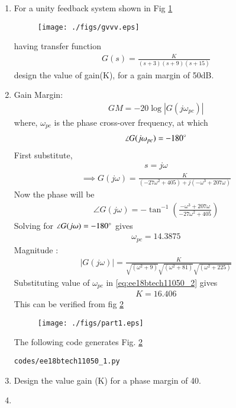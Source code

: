 
\begin{enumerate}[label=\thesection.\arabic*.,ref=\thesection.\theenumi]
\item For a unity feedback system shown in Fig \ref{fig:ee18btech11050_fig1}
\begin{figure}[!ht]
\centering
\texttt{[image: ./figs/gvvv.eps]}
\caption{}
\label{fig:ee18btech11050_fig1}
\end{figure}
having transfer function
\begin{align}
    G(s) = \frac{K}{(s+3)(s+9)(s+15)}
    \label{eq:ee18btech11050_1}
\end{align}
design the value of gain(K), for a gain margin of 50dB.

\item \solution

Gain Margin:
\begin{align}
    GM = -20\log{|G(j\omega_{pc})|}
    \label{eq:ee18btech11050_2}
\end{align}
where, $\omega_{pc}$ is the phase cross-over frequency, at which
\begin{align}
    \angle {G(j \omega_{pc})} = -180 \degree
    \label{eq:ee18btech11050_3}
\end{align}
First substitute, 
\begin{align}
    s = j\omega
\end{align}
\begin{align}
    \implies G(j\omega) = \frac{K}{(-27\omega^2+405)+j(-\omega^3+207\omega)}
    \label{eq:ee18btech11050_4}
\end{align}
Now the phase will be
\begin{align}
    \angle{G(j\omega)} = -\tan^{-1}(\frac{-\omega^3+207\omega}{-27\omega^2+405})
    \label{eq:ee18btech11050_5}
\end{align}
Solving for $\angle{G(j\omega)}=-180\degree$ gives
\begin{align}
  \omega_{pc} = 14.3875
\end{align}
Magnitude :
\begin{align}
    |G(j\omega)| = \frac{K}{\sqrt{(\omega^2+9)}\sqrt{(\omega^2+81)}\sqrt{(\omega^2+225)}}
    \label{eq:ee18btech11050_6}
\end{align}
Substituting value of $\omega_{pc}$ in \eqref{eq:ee18btech11050_2} gives
\begin{align}
    K = 16.406
\end{align}
This can be verified from fig \ref{fig:ee18btech11050_fig2}
\begin{figure}[!ht]
\centering
\texttt{[image: ./figs/part1.eps]}
\caption{}
\label{fig:ee18btech11050_fig2}
\end{figure}
The following code generates Fig. \ref{fig:ee18btech11050_fig2}
\begin{lstlisting}
codes/ee18btech11050_1.py
\end{lstlisting}
\item Design the value gain (K) for a phase margin of 40\degree.
\item \solution


\end{enumerate}
